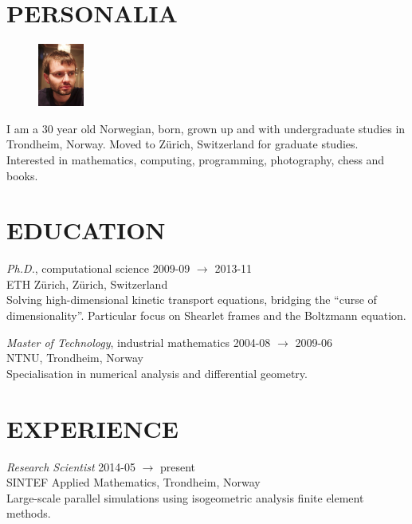 \documentclass[line,margin]{res}
\newcommand{\zh}{Z\"{u}rich}
\begin{document}
\address{Høgreina 394, NO-7079 Flatåsen}
\address{+41 41 44 98 89, evfonn@gmail.com}


\begin{resume}

\section{PERSONALIA}

\begin{figure}
  \vspace{-0.6cm}
  \includegraphics[width=1.5cm]{photo.png}
\end{figure}

I am a 30 year old Norwegian, born, grown up and with undergraduate studies in Trondheim,
Norway. Moved to Zürich, Switzerland for graduate studies. Interested in mathematics, computing,
programming, photography, chess and books.


\section{EDUCATION} 

{\em Ph.D.}, computational science \hfill 2009-09 $\to$ 2013-11 \\
ETH \zh, \zh, Switzerland \\
Solving high-dimensional kinetic transport equations, bridging the ``curse of
dimensionality''. Particular focus on Shearlet frames and the Boltzmann equation.

{\em Master of Technology}, industrial mathematics \hfill 2004-08 $\to$ 2009-06 \\
NTNU, Trondheim, Norway \\
Specialisation in numerical analysis and differential geometry.


\section{EXPERIENCE}

{\em Research Scientist} \hfill 2014-05 $\to$ present \\
SINTEF Applied Mathematics, Trondheim, Norway \\
Large-scale parallel simulations using isogeometric analysis finite element methods.


\end{resume}
\end{document}
